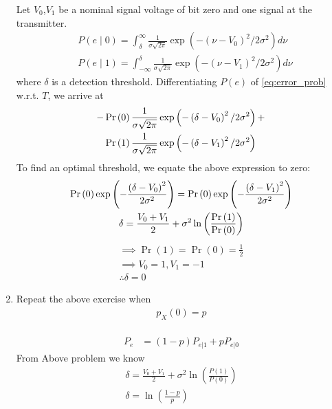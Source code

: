 \documentclass[10pt, a4paper]{article}
\begin{document}
\begin{enumerate}
Let $V_0$,$V_1$ be a nominal signal voltage of bit zero and  one  signal at the transmitter.
$$
\begin{aligned}
& P(e \mid 0)=\int_ \delta^{\infty} \frac{1}{\sigma \sqrt{2 \pi}} \exp \left(-\left(\nu-V_0\right)^2 / 2 \sigma^2\right) d \nu \\
& P(e \mid 1)=\int_{-\infty}^ \delta \frac{1}{\sigma \sqrt{2 \pi}} \exp \left(-\left(\nu-V_1\right)^2 / 2 \sigma^2\right) d \nu
\end{aligned}
$$
where  $\delta$ is a detection threshold.
Differentiating $P(e)$ of  \eqref{eq:error_prob} w.r.t. $T$, we arrive at
$$
\begin{gathered}
-\Pr\left(0\right) \frac{1}{\sigma \sqrt{2 \pi}} \exp \left(-\left( \delta-V_0\right)^2 / 2 \sigma^2\right)+ 
\\ \Pr\left(1\right) \frac{1}{\sigma \sqrt{2 \pi}} \exp \left(-\left( \delta-V_1\right)^2 / 2 \sigma^2\right)
\end{gathered}
$$
To find an optimal threshold, we equate the above expression to zero:
$$
\begin{gathered}
\Pr\left(0\right) \exp \left(-\frac{\left( \delta-V_0\right)^2}{2 \sigma^2}\right)=\Pr\left(0\right) \exp \left(-\frac{\left( \delta-V_1\right)^2}{2 \sigma^2}\right) \\
 \delta=\frac{V_0+V_1}{2}+\sigma^2 \ln \left(\frac{\Pr{(1)}}{\Pr\left(0\right)}\right)
\end{gathered}
$$
\begin{align*}
  \implies \Pr(1) = \Pr(0) = \frac{1}{2} \\
  \implies V_0=1,V_1=-1 \\
  \therefore  \delta =0 
\end{align*}




\item Repeat the above exercise when 
\label{prob:bpsk_decision_uneqi}
	\begin{align}
		p_{X}(0) = p
	\end{align}\\
\solution 
\begin{align}
	P_e &= (1-p)P_{e|1} + pP_{e|0}
\end{align}
From Above problem we know
$$
\begin{gathered}
 \delta=\frac{V_0+V_1}{2}+\sigma^2 \ln \left(\frac{P(1)}{P(0)}\right)\\
\delta =\ln \left(\frac{1-p}{p}\right)
\end{gathered}
$$
\end{enumerate}
\end{document}
